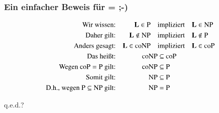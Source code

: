 \documentclass[onlymath]{beamer}
\begin{document}
\begin{frame}\frametitle{Ein einfacher Beweis für  =  ;-)}

\begin{align*}
\text{Wir wissen:}      && \textbf{\textcolor{black}{L}} \in {\textsc{P}} \quad& \text{impliziert}\quad \textbf{\textcolor{black}{L}} \in {\textsc{NP}}  \\
\text{Daher gilt:}  &&          \textbf{\textcolor{black}{L}} \notin {\textsc{NP}} \quad& \text{impliziert}\quad \textbf{\textcolor{black}{L}} \notin {\textsc{P}}\\
\text{Anders gesagt:}  &&   \textbf{\textcolor{black}{L}} \in {\textsc{coNP}} \quad& \text{impliziert}\quad \textbf{\textcolor{black}{L}} \in {\textsc{coP}} \\
\text{Das heißt:} &&       {\textsc{coNP}} &\subseteq  {\textsc{coP}}\\
\text{Wegen ${\textsc{coP}} = {\textsc{P}}$ gilt:}  &&            {\textsc{coNP}} &\subseteq {\textsc{P}}\\
\text{Somit gilt:} &&       {\textsc{NP}} &\subseteq {\textsc{P}}\\
\text{D.h., wegen ${\textsc{P}} \subseteq {\textsc{NP}}$ gilt:} &&       {\textsc{NP}} &= {\textsc{P}}
\end{align*}

\mbox{}\hfill q.e.d.?

\end{frame}


\end{document}
